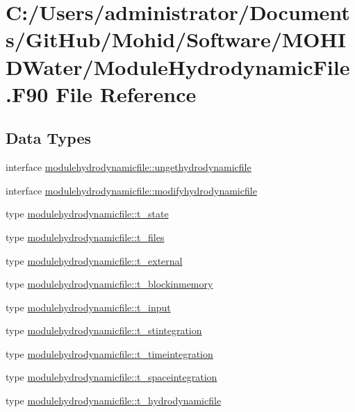 \hypertarget{_module_hydrodynamic_file_8_f90}{}\section{C\+:/\+Users/administrator/\+Documents/\+Git\+Hub/\+Mohid/\+Software/\+M\+O\+H\+I\+D\+Water/\+Module\+Hydrodynamic\+File.F90 File Reference}
\label{_module_hydrodynamic_file_8_f90}
\subsection*{Data Types}
\begin{DoxyCompactItemize}
\item 
interface \mbox{\hyperlink{interfacemodulehydrodynamicfile_1_1ungethydrodynamicfile}{modulehydrodynamicfile\+::ungethydrodynamicfile}}
\item 
interface \mbox{\hyperlink{interfacemodulehydrodynamicfile_1_1modifyhydrodynamicfile}{modulehydrodynamicfile\+::modifyhydrodynamicfile}}
\item 
type \mbox{\hyperlink{structmodulehydrodynamicfile_1_1t__state}{modulehydrodynamicfile\+::t\+\_\+state}}
\item 
type \mbox{\hyperlink{structmodulehydrodynamicfile_1_1t__files}{modulehydrodynamicfile\+::t\+\_\+files}}
\item 
type \mbox{\hyperlink{structmodulehydrodynamicfile_1_1t__external}{modulehydrodynamicfile\+::t\+\_\+external}}
\item 
type \mbox{\hyperlink{structmodulehydrodynamicfile_1_1t__blockinmemory}{modulehydrodynamicfile\+::t\+\_\+blockinmemory}}
\item 
type \mbox{\hyperlink{structmodulehydrodynamicfile_1_1t__input}{modulehydrodynamicfile\+::t\+\_\+input}}
\item 
type \mbox{\hyperlink{structmodulehydrodynamicfile_1_1t__stintegration}{modulehydrodynamicfile\+::t\+\_\+stintegration}}
\item 
type \mbox{\hyperlink{structmodulehydrodynamicfile_1_1t__timeintegration}{modulehydrodynamicfile\+::t\+\_\+timeintegration}}
\item 
type \mbox{\hyperlink{structmodulehydrodynamicfile_1_1t__spaceintegration}{modulehydrodynamicfile\+::t\+\_\+spaceintegration}}
\item 
type \mbox{\hyperlink{structmodulehydrodynamicfile_1_1t__hydrodynamicfile}{modulehydrodynamicfile\+::t\+\_\+hydrodynamicfile}}
\end{DoxyCompactItemize}

